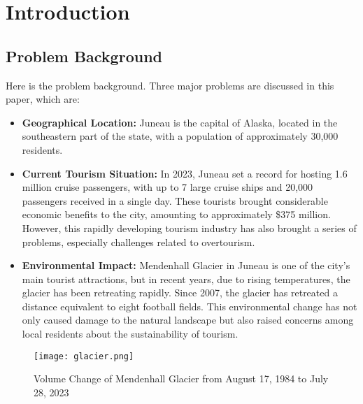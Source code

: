 \documentclass[12pt]{article}  %
\begin{document}
\maketitle  %
\tableofcontents  %


\section{Introduction}
\subsection{Problem Background}
Here is the problem background. Three major problems are discussed in this paper, which are:
\begin{itemize}
    \item \textbf{Geographical Location: }Juneau is the capital of Alaska, located in the southeastern part of the state, with a population of approximately 30,000 residents. 
    \item \textbf{Current Tourism Situation: }In 2023, Juneau set a record for hosting 1.6 million cruise passengers, with up to 7 large cruise ships and 20,000 passengers received in a single day.\cite{1} These tourists brought considerable economic benefits to the city, amounting to approximately \$375 million.\cite{2} However, this rapidly developing tourism industry has also brought a series of problems, especially challenges related to overtourism.
    \item \textbf{Environmental Impact: }Mendenhall Glacier in Juneau is one of the city's main tourist attractions, but in recent years, due to rising temperatures, the glacier has been retreating rapidly. Since 2007, the glacier has retreated a distance equivalent to eight football fields. This environmental change has not only caused damage to the natural landscape but also raised concerns among local residents about the sustainability of tourism.\cite{3}
\end{itemize}

\begin{figure}[H]
	\centering
	\texttt{[image: glacier.png]}
	\caption{Volume Change of Mendenhall Glacier from August 17, 1984 to July 28, 2023}\label{fig:glacier}
\end{figure}
\end{document}
